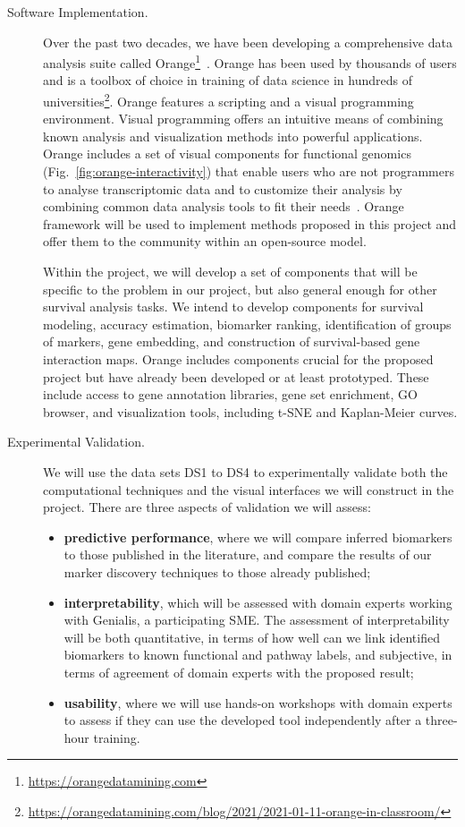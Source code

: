 \documentclass[11pt,a4paper]{article}
\newcommand{\myurl}[1]{\footnote{\url{#1}}}
\renewcommand{\bold}{\textbf}
\begin{document}
\begin{description}
	\item[Software Implementation.] Over the past two decades, we have been developing a comprehensive data analysis suite called Orange\myurl{https://orangedatamining.com}~\cite{Demsar2013,Curk2005,Godec2019}. Orange has been used by thousands of users and is a toolbox of choice in training of data science in hundreds of universities\myurl{https://orangedatamining.com/blog/2021/2021-01-11-orange-in-classroom/}. Orange features a scripting and a visual programming environment. Visual programming offers an intuitive means of combining known analysis and visualization methods into powerful applications. Orange includes a set of visual components for functional genomics (Fig.~\ref{fig:orange-interactivity}) that enable users who are not programmers to analyse transcriptomic data and to customize their analysis by combining common data analysis tools to fit their needs~\cite{Godec2019}. Orange framework will be used to implement methods proposed in this project and offer them to the community within an open-source model.

	Within the project, we will develop a set of components that will be specific to the problem in our project, but also general enough for other survival analysis tasks. We intend to develop components for survival modeling, accuracy estimation, biomarker ranking, identification of groups of markers, gene embedding, and construction of survival-based gene interaction maps. Orange includes components crucial for the proposed project but have already been developed or at least prototyped. These include access to gene annotation libraries, gene set enrichment, GO browser, and visualization tools, including t-SNE and Kaplan-Meier curves.

	\item[Experimental Validation.] We will use the data sets DS1 to DS4 to experimentally validate both the computational techniques and the visual interfaces we will construct in the project. There are three aspects of validation we will assess:
	\begin{itemize} 
		\item \bold{predictive performance}, where we will compare inferred biomarkers to those published in the literature, and compare the results of our marker discovery techniques to those already published;
		\item \bold{interpretability}, which will be assessed with domain experts working with Genialis, a participating SME. The assessment of interpretability will be both quantitative, in terms of how well can we link identified biomarkers to known functional and pathway labels, and subjective, in terms of agreement of domain experts with the proposed result;
		\item \bold{usability}, where we will use hands-on workshops with domain experts to assess if they can use the developed tool independently after a three-hour training.
	\end{itemize}
\end{description}
\end{document}
